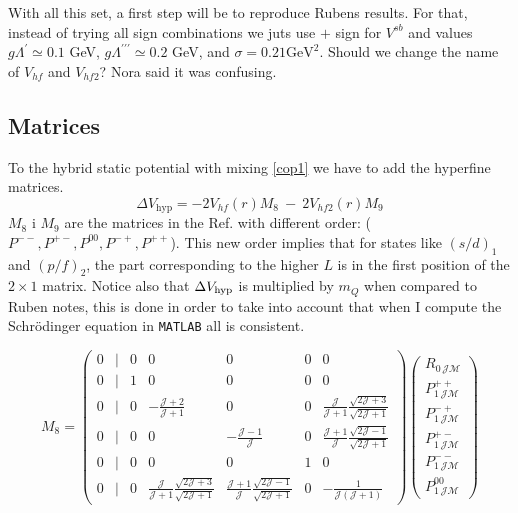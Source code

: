 \documentclass[11pt, a4paper]{article}
\begin{document}
With all this set, a first step will be to reproduce Rubens results. For that, instead of trying all sign combinations we juts use $+$ sign for $V^{sb}$ and values $g\Lambda^\prime \simeq 0.1$ GeV, $g\Lambda^{\prime\prime\prime} \simeq 0.2$ GeV, and $\sigma = 0.21 \text{GeV}^2$. {\color{blue} Should we change the name of $V_{hf}$ and $V_{hf2}$? Nora said it was confusing.}

\subsection{Matrices}
To the hybrid static potential with mixing \eqref{cop1} we have to add the hyperfine matrices.
$$\Delta V_{\text{hyp}} = -2 V_{hf}(r) M_8 \ - \ 2 V_{hf2}(r) M_9 $$
$M_8$ i $M_9$ are the matrices in the Ref. \cite{Soto:2023lbh} with different order: ($P^{--}, P^{+-}, P^{00}, P^{-+}, P^{++}$). This new order implies that for states like $(s/d)_1$ and $(p/f)_2$, the part corresponding to the higher $L$ is in the first position of the $2\times1$ matrix.
Notice also that $\Delta V_{\rm hyp}$ is multiplied by $m_Q$ when compared to Ruben notes, this is done in order to take into account that when I compute the Schrödinger equation in \texttt{MATLAB} all is consistent.

\begin{equation}\label{eq:M8}
M_8=
\begin{pmatrix}
0 &|& 0 & 0 & 0 & 0 & 0 \\ \hline
0 &|& 1 & 0 & 0 & 0 & 0 \\
0 &|& 0 & -\frac{\mathcal{J}+2}{\mathcal{J}+1} & 0 & 0 & \frac{\mathcal{J}}{\mathcal{J}+1}\frac{\sqrt{2\mathcal{J}+3}}{\sqrt{2\mathcal{J}+1}} \\
0 &|& 0 & 0 & -\frac{\mathcal{J}-1}{\mathcal{J}} & 0 & \frac{\mathcal{J}+1}{\mathcal{J}}\frac{\sqrt{2\mathcal{J}-1}}{\sqrt{2\mathcal{J}+1}} \\
0 &|& 0 & 0 & 0 & 1 & 0 \\
0 &|& 0 & \frac{\mathcal{J}}{\mathcal{J}+1}\frac{\sqrt{2\mathcal{J}+3}}{\sqrt{2\mathcal{J}+1}} & \frac{\mathcal{J}+1}{\mathcal{J}}\frac{\sqrt{2\mathcal{J}-1}}{\sqrt{2\mathcal{J}+1}} & 0 & -\frac{1}{\mathcal{J}(\mathcal{J}+1)}
\end{pmatrix}
\begin{pmatrix}
 		R_{0\, \mathcal{J}\mathcal{M}} \\ P_{1\, \mathcal{J}\mathcal{M}}^{++} \\
 		P_{1\, \mathcal{J}\mathcal{M}}^{-+} \\ P_{1\, \mathcal{J}\mathcal{M}}^{+-} \\
P_{1\, \mathcal{J}\mathcal{M}}^{--}\\ P_{1\, \mathcal{J}\mathcal{M}}^{00}
 	\end{pmatrix}
\end{equation}
\end{document}
